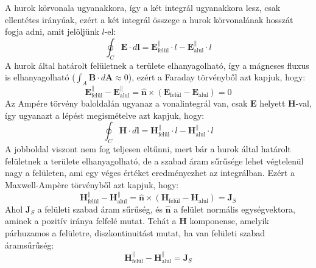\documentclass[../main.tex]{subfiles}
\begin{document}
A hurok körvonala ugyanakkora, így a két integrál ugyanakkora lesz, csak ellentétes irányúak, ezért a két integrál összege a hurok körvonalának hosszát fogja adni, amit jelöljünk $l$-el:
\begin{equation}
    \oint_C \mathbf{E} \cdot d\mathbf{l} = \mathbf{E}^{\parallel}_{\text{felül}} \cdot l - \mathbf{E}^{\parallel}_{\text{alul}} \cdot l
\end{equation}
A hurok által határolt felületnek a területe elhanyagolható, így a mágneses fluxus is elhanyagolható ($\int_A \mathbf{B} \cdot d\mathbf{A} \approx 0$), ezért a Faraday törvényből azt kapjuk, hogy:
\begin{equation}
    \mathbf{E}^{ \parallel}_{\text{felül}} - \mathbf{E}^{ \parallel}_{\text{alul}} = \hat{\mathbf{n}} \times (\mathbf{E}_{\text{felül}} - \mathbf{E}_{\text{alul}}) = 0
\end{equation}
Az Ampére törvény baloldalán ugyanaz a vonalintegrál van, csak $\mathbf{E}$ helyett $\mathbf{H}$-val, így ugyanazt a lépést megismételve azt kapjuk, hogy:
\begin{equation}
    \oint_C \mathbf{H} \cdot d\mathbf{l} = \mathbf{H}^{\parallel}_{\text{felül}} \cdot l - \mathbf{H}^{\parallel}_{\text{alul}} \cdot l
\end{equation}
A jobboldal viszont nem fog teljesen eltűnni, mert bár a hurok által határolt felületnek a területe elhanyagolható, de a szabad áram sűrűsége lehet végtelenül nagy a felületen, ami egy véges értéket eredményezhet az integrálban. Ezért a Maxwell-Ampère törvényből azt kapjuk, hogy:
\begin{equation}
    \mathbf{H}^{ \parallel}_{\text{felül}} - \mathbf{H}^{ \parallel}_{\text{alul}} = \hat{\mathbf{n}} \times (\mathbf{H}_{\text{felül}} - \mathbf{H}_{\text{alul}}) = \mathbf{J}_S
\end{equation}
Ahol $\mathbf{J}_S$ a felületi szabad áram sűrűség, és $\hat{\mathbf{n}}$ a felület normális egységvektora, aminek a pozitív iránya felfelé mutat. Tehát a $\mathbf{H}$ komponense, amelyik párhuzamos a felületre, diszkontinuitást mutat, ha van felületi szabad áramsűrűség:
\begin{equation}
    \mathbf{H}^{ \parallel}_{\text{felül}} - \mathbf{H}^{ \parallel}_{\text{alul}} = \mathbf{J}_S
\end{equation}
\end{document}
